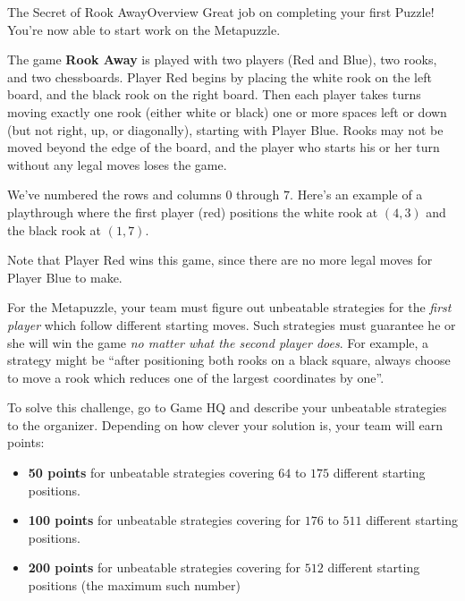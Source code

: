 
\begin{metapuzzle}{The Secret of Rook Away}{Overview}
  Great job on completing your first Puzzle! You're now able to start work on
  the Metapuzzle.

  \vfill


  \vfill

  The game \textbf{Rook Away} is played with two players (Red and Blue),
  two rooks, and two chessboards.
  Player Red begins by placing the white rook on the left board,
  and the black rook on the right board.
  Then each player takes turns moving exactly one rook (either white or black)
  one or more spaces left or down (but not right, up, or diagonally),
  starting with Player Blue. Rooks may not be moved beyond the edge
  of the board, and the player who
  starts his or her turn without any legal moves loses the game.

  We've numbered the rows and columns $0$ through $7$.
  Here's an example of a playthrough where the first player (red) positions
  the white rook at $(4,3)$ and the black rook at $(1,7)$.

  \vfill

  \newpage


  Note that Player Red wins this game, since there are no
  more legal moves for Player Blue to make.

  \newpage

  For the Metapuzzle, your team must figure out unbeatable strategies
  for the \textit{first player} which follow different starting moves.
  Such strategies must guarantee
  he or she will win the game \textit{no matter what the second player does}.
  For example, a strategy might be ``after positioning both rooks on a
  black square, always choose to move a rook which reduces one of the largest
  coordinates by one''.

  To solve this challenge, go to Game HQ and describe your
  unbeatable strategies to the organizer. Depending on how clever your
  solution is, your team will earn points:

  \begin{itemize}
    \item \textbf{50 points} for unbeatable strategies covering
    \(64\) to \(175\) different starting positions.
    \item \textbf{100 points} for unbeatable strategies covering
    for \(176\) to \(511\) different starting positions.
    \item \textbf{200 points} for unbeatable strategies covering
    for \(512\) different starting positions (the maximum such number)
  \end{itemize}


\end{metapuzzle}
